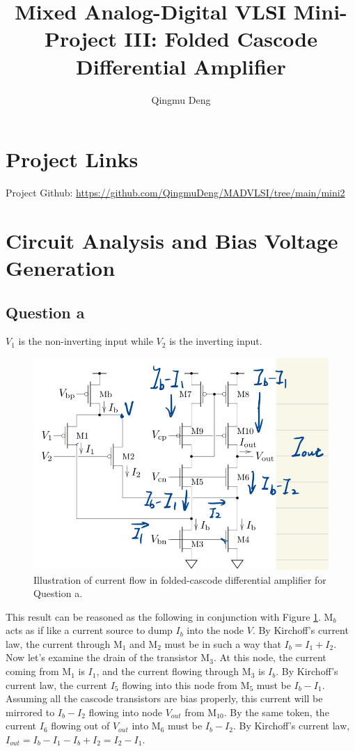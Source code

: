 \documentclass[11pt]{article}
\begin{document}
\title{Mixed Analog-Digital VLSI Mini-Project III: Folded Cascode Differential Amplifier}
\author{Qingmu Deng}
\maketitle %

\tableofcontents

\section*{Project Links}

Project Github: \href{https://github.com/QingmuDeng/MADVLSI/tree/main/mini2}{https://github.com/QingmuDeng/MADVLSI/tree/main/mini2}

\section{Circuit Analysis and Bias Voltage Generation}
    \subsection{Question a}
        $V_1$ is the non-inverting input while $V_2$ is the inverting input.
        \begin{figure}[!ht]
            \centering
            \includegraphics[width=.5\linewidth]{../img/qa.png}
            \caption{Illustration of current flow in folded-cascode differential amplifier for Question a.}
            \label{fig:qa}
        \end{figure}

        This result can be reasoned as the following in conjunction with Figure \ref{fig:qa}. M$_b$ acts as if like a current source to dump $I_b$ into the node $V$. By Kirchoff's current law, the current through M$_1$ and M$_2$ must be in such a way that $I_b=I_1+I_2$. Now let's examine the drain of the transistor M$_3$. At this node, the current coming from M$_1$ is $I_1$, and the current flowing through M$_3$ is $I_b$. By Kirchoff's current law, the current $I_5$ flowing into this node from M$_5$ must be $I_b-I_1$. Assuming all the cascode transistors are bias properly, this current will be mirrored to $I_b-I_2$ flowing into node $V_{out}$ from M$_10$. By the same token, the current $I_6$ flowing out of $V_{out}$ into M$_6$ must be $I_b-I_2$. By Kirchoff's current law, $I_{out}=I_b-I_1-I_b+I_2=I_2-I_1$.
\end{document}
